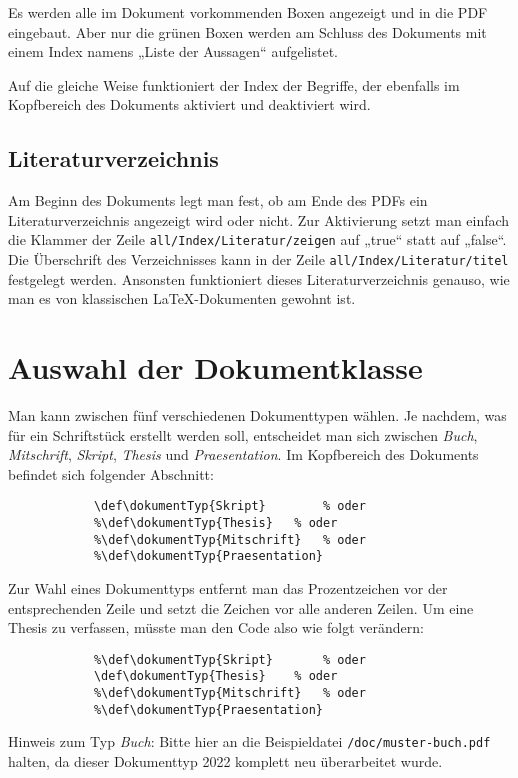 				Es werden alle im Dokument vorkommenden Boxen angezeigt und in die PDF eingebaut. Aber nur die grünen Boxen werden am Schluss des Dokuments mit einem Index namens „Liste der Aussagen“ aufgelistet.

				Auf die gleiche Weise funktioniert der Index der Begriffe, der ebenfalls im Kopfbereich des Dokuments aktiviert und deaktiviert wird.


			\subsection{Literaturverzeichnis}

				Am Beginn des Dokuments legt man fest, ob am Ende des PDFs ein Literaturverzeichnis angezeigt wird oder nicht. Zur Aktivierung setzt man einfach die Klammer der Zeile \texttt{all/Index/Literatur/zeigen} auf „true“ statt auf „false“. Die Überschrift des Verzeichnisses kann in der Zeile \texttt{all/Index/Literatur/titel} festgelegt werden. Ansonsten funktioniert dieses Literaturverzeichnis genauso, wie man es von klassischen \LaTeX{}-Dokumenten gewohnt ist.

		\section{Auswahl der Dokumentklasse}

			Man kann zwischen fünf verschiedenen Dokumenttypen wählen. Je nachdem, was für ein Schriftstück erstellt werden soll, entscheidet man sich zwischen \emph{Buch}, \emph{Mitschrift}, \emph{Skript}, \emph{Thesis} und \emph{Praesentation}. Im Kopfbereich des Dokuments befindet sich folgender Abschnitt:

			\begin{verbatim}
			\def\dokumentTyp{Skript}		% oder
			%\def\dokumentTyp{Thesis}	% oder
			%\def\dokumentTyp{Mitschrift}	% oder
			%\def\dokumentTyp{Praesentation}
			\end{verbatim}

			Zur Wahl eines Dokumenttyps entfernt man das Prozentzeichen vor der entsprechenden Zeile und setzt die Zeichen vor alle anderen Zeilen. Um eine Thesis zu verfassen, müsste man den Code also wie folgt verändern:
			\newpage
			\begin{verbatim}
			%\def\dokumentTyp{Skript}		% oder
			\def\dokumentTyp{Thesis}	% oder
			%\def\dokumentTyp{Mitschrift}	% oder
			%\def\dokumentTyp{Praesentation}
			\end{verbatim}

			\begin{redbox}
				Hinweis zum Typ \emph{Buch}:
				Bitte hier an die Beispieldatei \texttt{/doc/muster-buch.pdf} halten, da dieser Dokumenttyp 2022 komplett neu überarbeitet wurde.
			\end{redbox}

